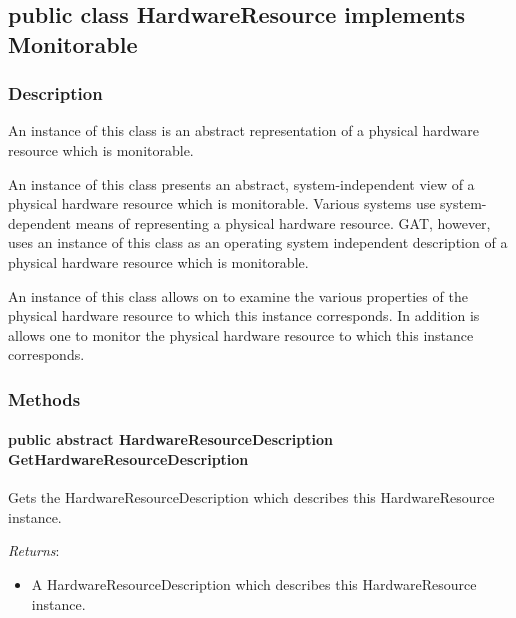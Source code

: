 \documentclass[$Date: 2003/06/26 19:29:31 $]{glabarticle}
\begin{document}
\newpage

\subsection{public class HardwareResource implements Monitorable}


\subsubsection{Description}

An instance of this class is an abstract representation of a physical
hardware resource which is monitorable.

An instance of this class presents an abstract, system-independent
view of a physical hardware resource which is monitorable. Various
systems use system-dependent means of representing a physical hardware
resource. GAT, however, uses an instance of this class as an operating
system independent description of a physical hardware resource which
is monitorable.

An instance of this class allows on to examine the various properties
of the physical hardware resource to which this instance
corresponds. In addition is allows one to monitor the physical
hardware resource to which this instance corresponds.


\subsubsection{Methods}

\paragraph{public abstract HardwareResourceDescription  GetHardwareResourceDescription}

Gets the HardwareResourceDescription which describes this
HardwareResource instance.

\textit{Returns}:
\begin{itemize}
\item[] A HardwareResourceDescription which describes this HardwareResource instance.
\end{itemize}

\end{document}

